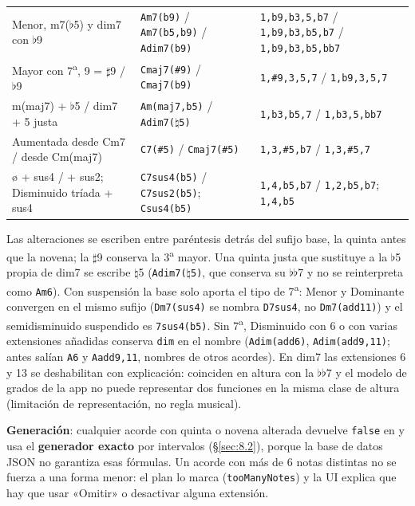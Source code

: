\documentclass[a4paper,11pt,oneside]{report}
\newcommand{\Sref}[1]{\S\ref{#1}}
\newcommand{\flt}{\ensuremath{\flat}}
\newcommand{\shp}{\ensuremath{\sharp}}
\begin{document}
\begin{center}
\begin{longtable}{L{5.4cm}L{3.9cm}L{5.0cm}}
Menor, m7(\flt5) y dim7 con \flt9 & \lstinline!Am7(b9)! / \lstinline!Am7(b5,b9)! / \lstinline!Adim7(b9)! & \lstinline!1,b9,b3,5,b7! / \lstinline!1,b9,b3,b5,b7! / \lstinline!1,b9,b3,b5,bb7!\\
Mayor con 7\textsuperscript{a}, 9 = \shp9 / \flt9 & \lstinline!Cmaj7(#9)! / \lstinline!Cmaj7(b9)! & \lstinline!1,#9,3,5,7! / \lstinline!1,b9,3,5,7!\\
m(maj7) + \flt5 / dim7 + 5 justa & \lstinline!Am(maj7,b5)! / \texttt{Adim7($\natural$5)} & \lstinline!1,b3,b5,7! / \lstinline!1,b3,5,bb7!\\
Aumentada desde Cm7 / desde Cm(maj7) & \lstinline!C7(#5)! / \lstinline!Cmaj7(#5)! & \lstinline!1,3,#5,b7! / \lstinline!1,3,#5,7!\\
ø + sus4 / + sus2; Disminuido tríada + sus4 & \lstinline!C7sus4(b5)! / \lstinline!C7sus2(b5)!; \lstinline!Csus4(b5)! & \lstinline!1,4,b5,b7! / \lstinline!1,2,b5,b7!; \lstinline!1,4,b5!\\
\end{longtable}
\end{center}

Las alteraciones se escriben entre paréntesis detrás del sufijo base, la quinta antes que la novena; la \shp9 conserva la 3\textsuperscript{a} mayor. Una quinta justa que sustituye a la \flt5 propia de dim7 se escribe $\natural$5 (\texttt{Adim7($\natural$5)}, que conserva su \flt\flt7 y no se reinterpreta como \lstinline!Am6!). Con suspensión la base solo aporta el tipo de 7\textsuperscript{a}: Menor y Dominante convergen en el mismo sufijo (\lstinline!Dm7(sus4)! se nombra \lstinline!D7sus4!, no \lstinline!Dm7(add11)!) y el semidisminuido suspendido es \lstinline!7sus4(b5)!. Sin 7\textsuperscript{a}, Disminuido con 6 o con varias extensiones añadidas conserva \lstinline!dim! en el nombre (\lstinline!Adim(add6)!, \lstinline!Adim(add9,11)!; antes salían \lstinline!A6! y \lstinline!Aadd9,11!, nombres de otros acordes). En dim7 las extensiones 6 y 13 se deshabilitan con explicación: coinciden en altura con la \flt\flt7 y el modelo de grados de la app no puede representar dos funciones en la misma clase de altura (limitación de representación, no regla musical).

\textbf{Generación}: cualquier acorde con quinta o novena alterada devuelve \texttt{false} en \texttt{} y usa el \textbf{generador exacto} por intervalos (\Sref{sec:8.2}), porque la base de datos JSON no garantiza esas fórmulas. Un acorde con más de 6 notas distintas no se fuerza a una forma menor: el plan lo marca (\lstinline!tooManyNotes!) y la UI explica que hay que usar «Omitir» o desactivar alguna extensión.
\end{document}
